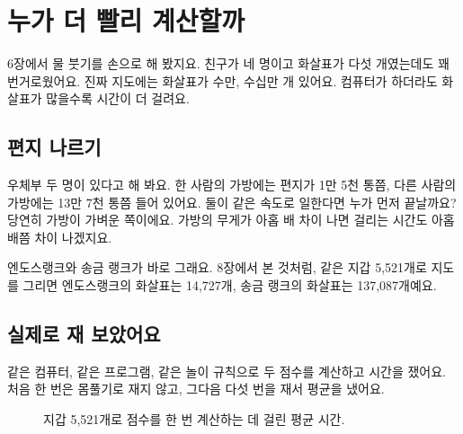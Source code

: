 \chapter{누가 더 빨리 계산할까}

6장에서 물 붓기를 손으로 해 봤지요.
친구가 네 명이고 화살표가 다섯 개였는데도 꽤 번거로웠어요.
진짜 지도에는 화살표가 수만, 수십만 개 있어요.
컴퓨터가 하더라도 화살표가 많을수록 시간이 더 걸려요.

\section{편지 나르기}

우체부 두 명이 있다고 해 봐요.
한 사람의 가방에는 편지가 1만 5천 통쯤, 다른 사람의 가방에는 13만 7천 통쯤 들어 있어요.
둘이 같은 속도로 일한다면 누가 먼저 끝날까요?
당연히 가방이 가벼운 쪽이에요.
가방의 무게가 아홉 배 차이 나면 걸리는 시간도 아홉 배쯤 차이 나겠지요.

엔도스랭크와 송금 랭크가 바로 그래요.
8장에서 본 것처럼, 같은 지갑 5,521개로 지도를 그리면
엔도스랭크의 화살표는 14,727개, 송금 랭크의 화살표는 137,087개예요.

\section{실제로 재 보았어요}

같은 컴퓨터, 같은 프로그램, 같은 놀이 규칙으로 두 점수를 계산하고 시간을 쟀어요.
처음 한 번은 몸풀기로 재지 않고, 그다음 다섯 번을 재서 평균을 냈어요.

\begin{figure}[h]
\centering
{}
\caption{지갑 5,521개로 점수를 한 번 계산하는 데 걸린 평균 시간.}
\end{figure}

